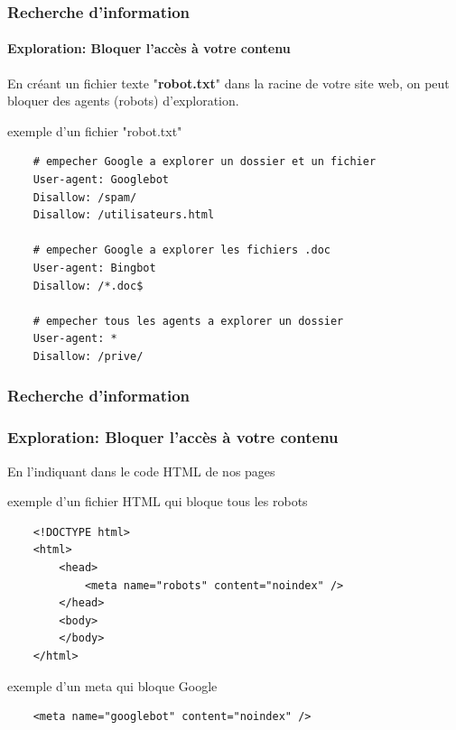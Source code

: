 \documentclass{beamer}
\begin{document}
\begin{frame}[fragile]
\frametitle{Recherche d'information}
\framesubtitle{Exploration: Bloquer l'accès à votre contenu}


En créant un fichier texte "\textbf{robot.txt}" dans la racine de votre site web, on peut bloquer des agents (robots) d'exploration.

%	

\begin{exampleblock}{exemple d'un fichier "robot.txt"}
	\scriptsize\bfseries
	\begin{lstlisting}
	# empecher Google a explorer un dossier et un fichier
	User-agent: Googlebot
	Disallow: /spam/ 
	Disallow: /utilisateurs.html
	
	# empecher Google a explorer les fichiers .doc 
	User-agent: Bingbot
	Disallow: /*.doc$ 
	
	# empecher tous les agents a explorer un dossier
	User-agent: *
	Disallow: /prive/
	\end{lstlisting}
\end{exampleblock}


\end{frame}

\begin{frame}[fragile]
\frametitle{Recherche d'information}
\frametitle{Exploration: Bloquer l'accès à votre contenu}

En l'indiquant dans le code HTML de nos pages

\begin{exampleblock}{exemple d'un fichier HTML qui bloque tous les robots}
	\scriptsize\bfseries
	\begin{lstlisting}
	<!DOCTYPE html>
	<html>
	    <head>
	        <meta name="robots" content="noindex" />
	    </head>
	    <body>
	    </body>
	</html>
	\end{lstlisting}
\end{exampleblock}

\begin{exampleblock}{exemple d'un meta qui bloque Google}
	\scriptsize\bfseries
	\begin{lstlisting}
	<meta name="googlebot" content="noindex" />
	\end{lstlisting}
\end{exampleblock}

\end{frame}
\end{document}
